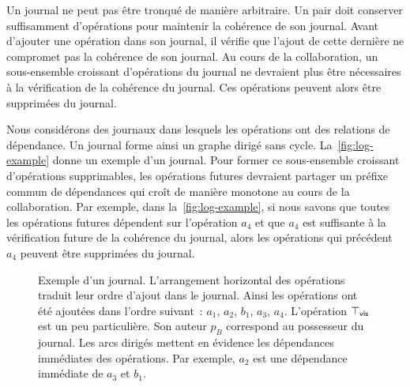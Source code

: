 Un journal ne peut pas être tronqué de manière arbitraire.
Un pair doit conserver suffisamment d'opérations pour maintenir la cohérence de son journal.
Avant d'ajouter une opération dans son journal, il vérifie que l'ajout de cette dernière ne compromet pas la cohérence de son journal.
Au cours de la collaboration, un sous-ensemble croissant d'opérations du journal ne devraient plus être nécessaires à la vérification de la cohérence du journal.
Ces opérations peuvent alors être supprimées du journal.

Nous considérons des journaux dans lesquels les opérations ont des relations de dépendance.
Un journal forme ainsi un graphe dirigé sans cycle.
La~\autoref{fig:log-example} donne un exemple d'un journal.
Pour former ce sous-ensemble croissant d'opérations supprimables, les opérations futures devraient partager un préfixe commun de dépendances qui croît de manière monotone au cours de la collaboration.
Par exemple, dans la~\autoref{fig:log-example}, si nous savons que toutes les opérations futures dépendent sur l'opération $a_4$ et que $a_4$ est suffisante à la vérification future de la cohérence du journal, alors les opérations qui précédent $a_4$ peuvent être supprimées du journal.

\begin{figure}[htb]
\centering
{}
\caption[Représentation d'un journal]{Exemple d'un journal.
L'arrangement horizontal des opérations traduit leur ordre d'ajout dans le journal.
Ainsi les opérations ont été ajoutées dans l'ordre suivant~: $a_1$, $a_2$, $b_1$, $a_3$, $a_4$.
L'opération $\top_{\operatorname{\mathsf{vis}}}$ est un peu particulière.
Son auteur $p_B$ correspond au possesseur du journal.
Les arcs dirigés mettent en évidence les dépendances immédiates des opérations.
Par exemple, $a_2$ est une dépendance immédiate de $a_3$ et $b_1$.
}
\label{fig:log-example}
\end{figure}

